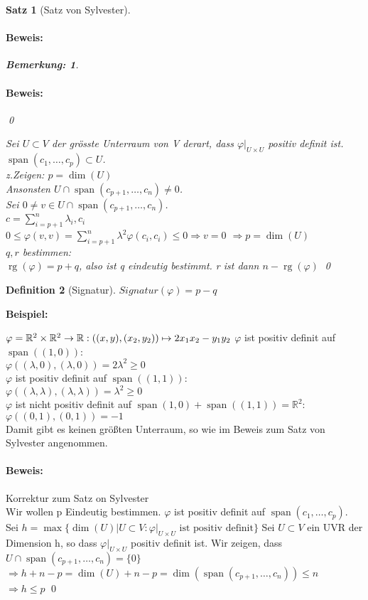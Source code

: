 \documentclass{report}
\newcommand{\lb}{\lambda}
\newcommand{\R}{\mathbb{R}}
\DeclareMathOperator{\Span}{span}
\DeclareMathOperator{\rg}{rg}
\newenvironment{beispiel} {
\textbf{Beispiel:}\hfill\break
}{}
\theoremstyle{customrem}
\newtheorem*{bemerkung}{Bemerkung\textnormal:}
\theoremstyle{customdef}
\newtheorem{definition}{Definition}[chapter]
\newtheorem{satz}[definition]{Satz}
\renewenvironment{proof}{\paragraph{Beweis: }}{\qed}
\theoremstyle{customenv}
\begin{document}
\begin{satz}[Satz von Sylvester]
\begin{proof}
\begin{bemerkung}
\begin{proof}
      \end{proof}
    \end{bemerkung}
    Sei \(U \subset V\) der gr\"osste Unterraum von V derart, dass
    \(\varphi|_{U \times U}\) positiv definit ist.\\
    \(\Span(c_1, \dots, c_p) \subset U\).\\
    z.Zeigen: \(p = \dim(U)\)\\
    Ansonsten \(U \cap \Span(c_{p+1}, \dots, c_n) \neq 0\).\\
    Sei \(0 \neq v \in U \cap \Span(c_{p+1}, \dots, c_n)\).\\
    \(c = \sum_{i=p+1}^n \lb_i, c_i\)\\
    \(0 \le \varphi(v, v) = \sum_{i=p+1}^n \lb^2 \varphi(c_i, c_i) \le 0
    \Rightarrow v = 0\)
    \(\Rightarrow p = \dim(U)\)\\
    \(q, r\) bestimmen:\\
    \(\rg(\varphi) = p + q\), also ist q eindeutig bestimmt. r ist dann
    \(n - \rg(\varphi)\)
    \end{proof}
\end{satz}

\begin{definition}[Signatur]
  \(Signatur(\varphi) = p - q\)
\end{definition}

\begin{beispiel}
  \(
  \varphi = \R^2 \times \R^2 \to \R : ((x, y), (x_2, y_2)) \mapsto 2 x_1x_2 - y_1y_2\\
  \)
  \(\varphi\) ist positiv definit auf \(\Span((1, 0))\):\\
  \(\varphi((\lb, 0), (\lb, 0)) = 2 \lb^2 \ge 0\)\\
  \(\varphi\) ist positiv definit auf \(\Span((1, 1))\):\\
  \(\varphi((\lb, \lb), (\lb, \lb)) = \lb^2 \ge 0\)\\
  \(\varphi\) ist nicht positiv definit auf \(\Span(1, 0) + \Span((1, 1)) = \R^2\):\\
  \(\varphi((0, 1), (0, 1)) = -1\)\\
  Damit gibt es keinen gr\"o\ss{}ten Unterraum, so wie im Beweis zum Satz von
  Sylvester angenommen.
\end{beispiel}

\begin{proof} Korrektur zum Satz on Sylvester\\
 Wir wollen p Eindeutig bestimmen. \(\varphi\) ist positiv definit auf
 \(\Span(c_1, \dots, c_p)\).\\
 Sei \(h = \max\{\dim(U) | U \subset V : \varphi|_{U \times U} \text{ ist positiv definit}\}\)
 Sei \(U \subset V\) ein UVR der Dimension h, so dass \(\varphi|_{U \times U}\)
 positiv definit ist. Wir zeigen, dass \(U \cap \Span(c_{p+1}, \dots, c_n) = \{0\}\)
 \(\Rightarrow h+n-p = \dim(U) + n - p = \dim(\Span(c_{p+1}, \dots, c_n)) \le n\)\\
 \(\Rightarrow h \le p\)
\end{proof}
\end{document}
